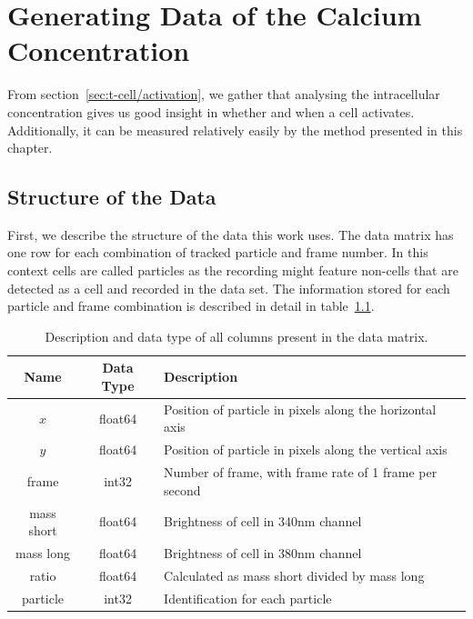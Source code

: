 \chapter{Generating Data of the Calcium Concentration}
\label{chapter:data}

From section~\ref{sec:t-cell/activation}, we gather that analysing the intracellular \Calcium concentration gives us good insight in whether and when a cell activates. Additionally, it can be measured relatively easily by the method presented in this chapter.

\section{Structure of the Data}
\label{sec:structure_of_data}

First, we describe the structure of the data this work uses. 
The data matrix has one row for each combination of tracked particle and frame number. In this context cells are called particles as the recording might feature non-cells that are detected as a cell and recorded in the data set. The information stored for each particle and frame combination is described in detail in table~\ref{tab:information_data_matrix}.

\begin{table}[h!]
	\centering
	\begin{tabular}{|c|c|l|}
		\hline
		\textbf{Name} & \textbf{Data Type} & \textbf{Description} \\
		\hline
		\hline
		$x$ & float64 & Position of particle in pixels along the horizontal axis \\
		\hline
		$y$ & float64 & Position of particle in pixels along the vertical axis \\
		\hline
		frame & int32 & Number of frame, with frame rate of 1 frame per second \\
		\hline
		mass short & float64 & Brightness of cell in 340nm channel \\
		\hline
		mass long & float64 & Brightness of cell in 380nm channel \\
		\hline
		ratio & float64 & Calculated as mass short divided by mass long \\
		\hline
		particle & int32 & Identification for each particle \\
		\hline
	\end{tabular}
	\caption{Description and data type of all columns present in the data matrix.}
	\label{tab:information_data_matrix}
\end{table}

